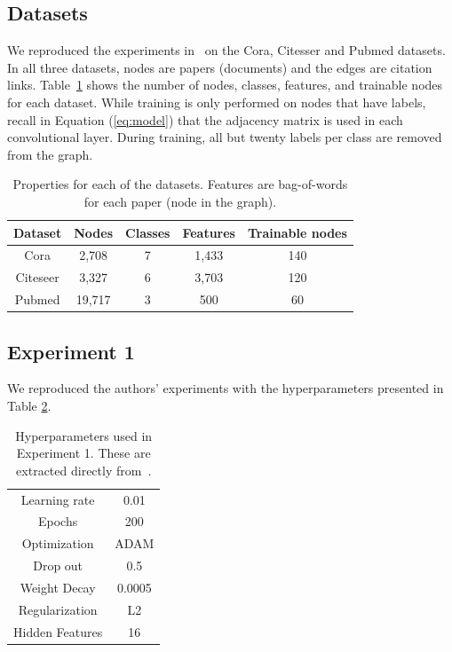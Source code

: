 \subsection{Datasets}

We reproduced the experiments in~\cite{Kipf2016} on the Cora, Citesser and Pubmed datasets. In all three datasets, nodes are papers (documents) and the edges are citation links. Table~\ref{tab:datasets} shows the number of nodes, classes, features, and trainable nodes for each dataset. While training is only performed on nodes that have labels, recall in Equation (\ref{eq:model}) that the adjacency matrix is used in each convolutional layer. During training, all but twenty labels per class are removed from the graph. 

\begin {table}[ht!]
  \begin{center}
    \begin{tabular}{|c|c|c|c|c|}
    \hline
    Dataset  & Nodes  & Classes & Features & Trainable nodes\\
    \hline 
    Cora     & 2,708  & 7       & 1,433    & 140 \\ 
    Citeseer & 3,327  & 6       & 3,703    & 120  \\  
    Pubmed   & 19,717 & 3       & 500      & 60   \\
    \hline
    \end{tabular}
  \end{center}
\caption {Properties for each of the datasets. Features are bag-of-words for each paper (node in the graph).} \label{tab:datasets} 
\end{table}

\subsection{Experiment 1}

We reproduced the authors' experiments with the hyperparameters presented in Table \ref{tab:hyperparameters1}.

\begin {table}[ht!]
  \begin{center}
    \begin{tabular}{|c|c|}
    \hline
    Learning rate     & 0.01 \\ 
    Epochs            & 200  \\ 
    Optimization      & ADAM \\
    Drop out          & 0.5   \\
    Weight Decay      & 0.0005 \\
    Regularization    & L2    \\
    Hidden Features   & 16    \\
    \hline
    \end{tabular}
  \end{center}
\caption {Hyperparameters used in Experiment 1. These are extracted directly from~\cite{Kipf2016}.} \label{tab:hyperparameters1} 
\end{table}

